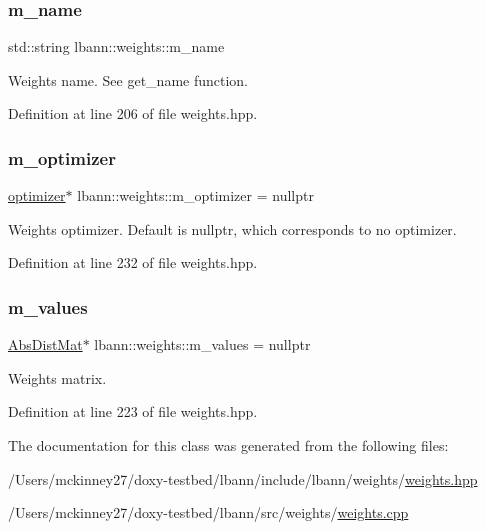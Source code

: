 \subsubsection{\texorpdfstring{m\+\_\+name}{m\_name}}
{\footnotesize\ttfamily std\+::string lbann\+::weights\+::m\+\_\+name\hspace{0.3cm}{\ttfamily [private]}}

Weights name. See get\+\_\+name function. 

Definition at line 206 of file weights.\+hpp.

\mbox{\label{classlbann_1_1weights_a5f3b4d4a3ad390c2a9bdbe6c4971de65}} 
\subsubsection{\texorpdfstring{m\+\_\+optimizer}{m\_optimizer}}
{\footnotesize\ttfamily \hyperlink{classlbann_1_1optimizer}{optimizer}$\ast$ lbann\+::weights\+::m\+\_\+optimizer = nullptr\hspace{0.3cm}{\ttfamily [private]}}

Weights optimizer. Default is nullptr, which corresponds to no optimizer. 

Definition at line 232 of file weights.\+hpp.

\mbox{\label{classlbann_1_1weights_a6b2df671b6d4c4dd595477971eea0543}} 
\subsubsection{\texorpdfstring{m\+\_\+values}{m\_values}}
{\footnotesize\ttfamily \hyperlink{base_8hpp_a9a697a504ae84010e7439ffec862b470}{Abs\+Dist\+Mat}$\ast$ lbann\+::weights\+::m\+\_\+values = nullptr\hspace{0.3cm}{\ttfamily [private]}}

Weights matrix. 

Definition at line 223 of file weights.\+hpp.



The documentation for this class was generated from the following files\+:\begin{DoxyCompactItemize}
\item 
/\+Users/mckinney27/doxy-\/testbed/lbann/include/lbann/weights/\hyperlink{weights_8hpp}{weights.\+hpp}\item 
/\+Users/mckinney27/doxy-\/testbed/lbann/src/weights/\hyperlink{weights_8cpp}{weights.\+cpp}\end{DoxyCompactItemize}
